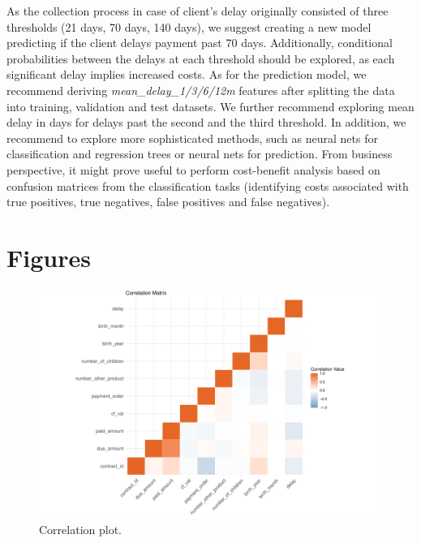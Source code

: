 \documentclass[
]{article}
\begin{document}
As the collection process in case of client's delay originally consisted of three thresholds (21 days, 70 days, 140 days), we suggest creating a new model predicting if the client delays payment past 70 days. Additionally, conditional probabilities between the delays at each threshold should be explored, as each significant delay implies increased costs. As for the prediction model, we recommend deriving \emph{mean\_delay\_1/3/6/12m} features after splitting the data into training, validation and test datasets. We further recommend exploring mean delay in days for delays past the second and the third threshold.
In addition, we recommend to explore more sophisticated methods, such as neural nets for classification and regression trees or neural nets for prediction. From business perspective, it might prove useful to perform cost-benefit analysis based on confusion matrices from the classification tasks (identifying costs associated with true positives, true negatives, false positives and false negatives).

\hypertarget{figures}{%
\section{Figures}\label{figures}}

\begin{figure}
\centering
\includegraphics{Documentation_Rmarkdown_files/figure-latex/correlogram-1.pdf}
\caption{\label{fig:correlogram}\label{fig:correlogram}Correlation plot.}
\end{figure}
\end{document}
